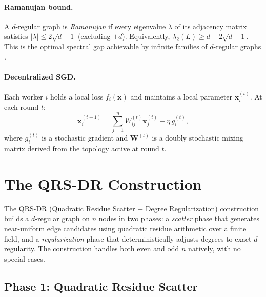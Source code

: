 \documentclass{article}
\newcommand{\bW}{\mathbf{W}}
\newcommand{\bx}{\mathbf{x}}
\newcommand{\lam}{\lambda_2}
\begin{document}
\paragraph{Ramanujan bound.}
A $d$-regular graph is \emph{Ramanujan} if every eigenvalue $\lambda$ of its
adjacency matrix satisfies $|\lambda| \le 2\sqrt{d-1}$ (excluding $\pm d$).
Equivalently, $\lam(L) \ge d - 2\sqrt{d-1}$.  This is the optimal spectral
gap achievable by infinite families of $d$-regular graphs
\cite{lps1988, nilli1991}.

\paragraph{Decentralized SGD.}
Each worker $i$ holds a local loss $f_i(\bx)$ and maintains a local
parameter $\bx_i^{(t)}$.  At each round $t$:
\begin{equation}
\label{eq:dpsgd}
\bx_i^{(t+1)} = \sum_{j=1}^{n} W_{ij}^{(t)} \bx_j^{(t)}
              - \eta \, g_i^{(t)},
\end{equation}
where $g_i^{(t)}$ is a stochastic gradient and $\bW^{(t)}$ is a doubly
stochastic mixing matrix derived from the topology active at round $t$.


\section{The QRS-DR Construction}
\label{sec:construction}

The QRS-DR (Quadratic Residue Scatter + Degree Regularization)
construction builds a $d$-regular graph on $n$ nodes in two phases:
a \emph{scatter} phase that generates near-uniform edge candidates using
quadratic residue arithmetic over a finite field, and a
\emph{regularization} phase that deterministically adjusts degrees to
exact $d$-regularity.  The construction handles both even and odd $n$
natively, with no special cases.

\subsection{Phase 1: Quadratic Residue Scatter}
\label{sec:scatter}
\end{document}
